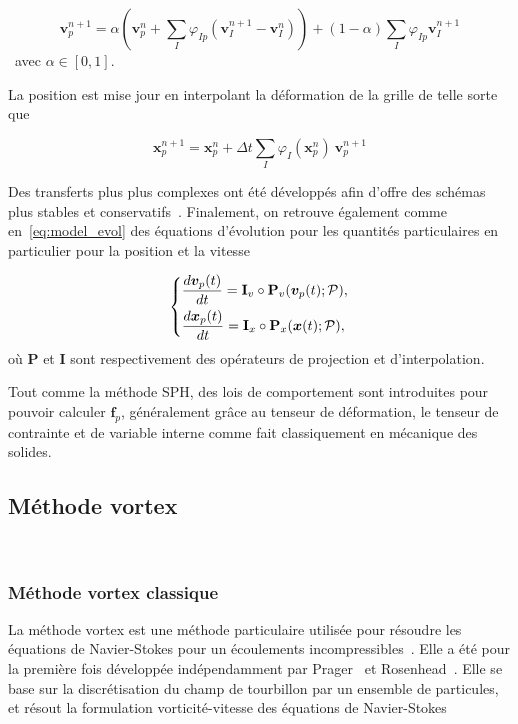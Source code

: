 \begin{equation*}
    \bm v_{p}^{n+1} = \alpha \left(\bm v_{p}^{n} + \sum_I \varphi_{Ip} (\bm v_I^{n+1} - \bm v_I^{n})\right) + (1- \alpha)\sum_I \varphi_{Ip} \bm v_I^{n+1}
\end{equation*}~avec $\alpha \in [0, 1]$.

La position est mise jour en interpolant la déformation de la grille de telle sorte que

\begin{equation*}
    \bm x_p^{n+1} = \bm x_p^{n} + \Delta t \sum_I \varphi_I(\bm x_p^n)~\bm v_p^{n+1}
\end{equation*}

Des transferts plus plus complexes ont été développés afin d'offre des schémas plus stables et conservatifs~\cite{jiang_affine_2015,fu_polynomial_2017,hu_moving_2018}. Finalement, on retrouve également comme en~\eqref{eq:model_evol} des équations d'évolution pour les quantités particulaires en particulier pour la position et la vitesse

\begin{gather}
    \left\{\begin{aligned}
         & \frac{d\bm v_p(t)}{dt} = \mathbf I_v \circ \mathbf P_v(\bm v_p(t);\mathcal P), \\
         & \frac{d \bm{x}_p(t)}{d t} = \mathbf I_x \circ \mathbf P_x(\bm{x}(t);\mathcal P),
    \end{aligned} \right.
\end{gather}où $\mathbf P$ et $\mathbf I$ sont respectivement des opérateurs de projection et d'interpolation.

Tout comme la méthode SPH, des lois de comportement sont introduites pour pouvoir calculer $\bm f_p$, généralement grâce au tenseur de déformation, le tenseur de contrainte et de variable interne comme fait classiquement en mécanique des solides.

\subsection{Méthode vortex}~\label{sec:vortex}

\subsubsection{Méthode vortex classique}

La méthode vortex est une méthode particulaire utilisée pour résoudre les équations de Navier-Stokes pour un écoulements incompressibles~\cite{Cottet_Koumoutsakos_2000}. Elle a été pour la première fois développée indépendamment par Prager~\cite{prager1928druckverteilung} et Rosenhead~\cite{rosenhead1931formation}. Elle se base sur la discrétisation du champ de tourbillon par un ensemble de particules, et résout la formulation vorticité-vitesse des équations de Navier-Stokes


